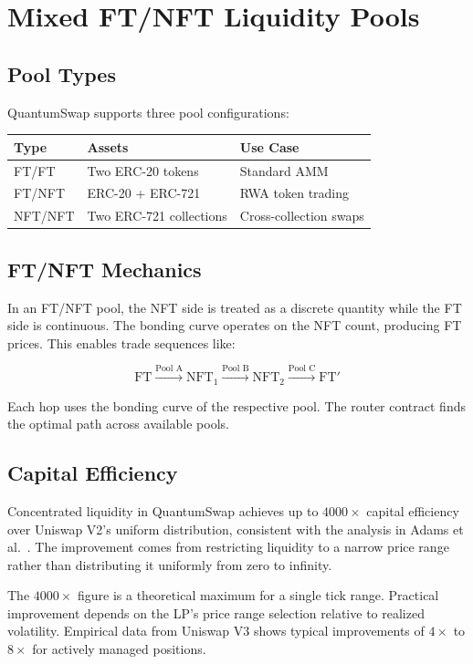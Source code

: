 \section{Mixed FT/NFT Liquidity Pools}


\subsection{Pool Types}

QuantumSwap supports three pool configurations:

\begin{center}
\begin{tabular}{lll}
\toprule
\textbf{Type} & \textbf{Assets} & \textbf{Use Case} \\
\midrule
FT/FT & Two ERC-20 tokens & Standard AMM \\
FT/NFT & ERC-20 + ERC-721 & RWA token trading \\
NFT/NFT & Two ERC-721 collections & Cross-collection swaps \\
\bottomrule
\end{tabular}
\end{center}

\subsection{FT/NFT Mechanics}

In an FT/NFT pool, the NFT side is treated as a discrete quantity
while the FT side is continuous. The bonding curve operates on the
NFT count, producing FT prices. This enables trade sequences like:

\[
\text{FT} \xrightarrow{\text{Pool A}} \text{NFT}_1
\xrightarrow{\text{Pool B}} \text{NFT}_2
\xrightarrow{\text{Pool C}} \text{FT}'
\]

Each hop uses the bonding curve of the respective pool. The router
contract finds the optimal path across available pools.

\subsection{Capital Efficiency}

Concentrated liquidity in QuantumSwap achieves up to $4000\times$
capital efficiency over Uniswap V2's uniform distribution, consistent
with the analysis in Adams et al.~\cite{uniswapv3}. The improvement
comes from restricting liquidity to a narrow price range rather than
distributing it uniformly from zero to infinity.

\begin{remark}
The $4000\times$ figure is a theoretical maximum for a single tick
range. Practical improvement depends on the LP's price range selection
relative to realized volatility. Empirical data from Uniswap V3
shows typical improvements of $4\times$ to $8\times$ for actively
managed positions.
\end{remark}

